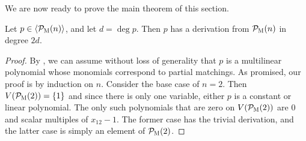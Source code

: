 We are now ready to prove the main theorem of this section.
\begin{theorem}\label{thm:matching-effective}
Let $p \in \langle \mathcal P_{\textsc{M}}(n) \rangle$, and let $d = \deg p$. Then $p$ has a derivation from $\mathcal P_{\textsc{M}}(n)$ in degree $2d$. 
\end{theorem}
\begin{proof}
By , we can assume without loss of generality that $p$ is a multilinear polynomial whose monomials correspond to partial matchings.
As promised, our proof is by induction on $n$. Consider the base case of $n = 2$. 
Then $V(\mathcal P_{\textsc{M}}(2)) = \{1\}$ and since there is only one variable, either $p$ is a constant or linear polynomial.
The only such polynomials that are zero on $V(\mathcal P_{\textsc{M}}(2))$ are $0$ and scalar multiples of $x_{12} - 1$. 
The former case has the trivial derivation, and the latter case is simply an element of $\mathcal P_{\textsc{M}}(2)$. 


\end{proof}
